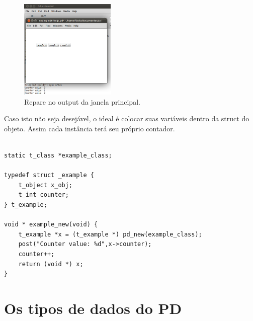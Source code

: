 \documentclass[10pt,a4paper]{report}
\begin{document}
\begin{figure}[h!]
	\centering
	\includegraphics[height=180]{./images/example16}
	\caption{Repare no output da janela principal.}
\end{figure}

Caso isto não seja desejável, o ideal é colocar suas variáveis dentro da struct do objeto. Assim cada instância terá seu próprio contador.

\begin{lstlisting}

static t_class *example_class;

typedef struct _example {
    t_object x_obj;
    t_int counter;
} t_example;

void * example_new(void) {
    t_example *x = (t_example *) pd_new(example_class);
    post("Counter value: %d",x->counter);
    counter++;
    return (void *) x;
}

\end{lstlisting}


\chapter{Os tipos de dados do PD}
\end{document}

